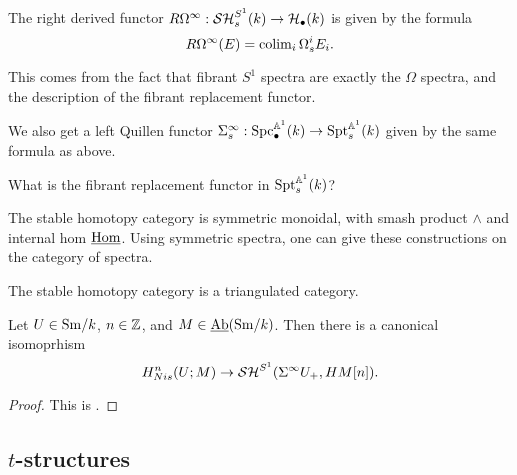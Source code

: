\documentclass{amsart}%
\begin{document}
\begin{remark}
  The right derived functor
  $R\Omega^{\infty} : \mathcal{SH}^{S^1}_s(k) \to \mathcal{H}_{\bullet}(k)$ is given by
  the formula
  \begin{equation*}
    R\Omega^{\infty}(E) = \operatorname{colim}_i \Omega_s^{i}E_i.
  \end{equation*}

  This comes from the fact that fibrant $S^1$ spectra are exactly the
  $\Omega$ spectra, and the description of the fibrant replacement
  functor. 
\end{remark}

\begin{remark}
  We also get a left Quillen functor
  $ \Sigma^{\infty}_s : \mathrm{Spc}_{\bullet}^{\mathbb{A}^1}(k) \to
  \mathrm{Spt}_s^{\mathbb{A}^1}(k)$ given by the same formula as above.

  What is the fibrant replacement functor in $\mathrm{Spt}_s^{\mathbb{A}^1}(k)$?
\end{remark}

\begin{remark}
  The stable homotopy category is symmetric monoidal, with smash
  product $\wedge$ and internal hom $\underline{\operatorname{Hom}}$. Using
  symmetric spectra, one can give these constructions on the category
  of spectra.

  The stable homotopy category is a triangulated category.  
\end{remark}

\begin{proposition}
  Let $U \in \mathrm{Sm}/k$, $n\in \mathbb{Z}$, and $M \in \operatorname{\underline{Ab}}(\mathrm{Sm}/k)$. Then there
  is a canonical isomoprhism
  \begin{equation*}
    H^n_{Nis}(U; M) \to \mathcal{SH}^{S^1}(\Sigma^{\infty}U_+, HM[n]).
  \end{equation*}
\end{proposition}

\begin{proof}
  This is \cite[Lemma 3.2.3]{Mor05}.
\end{proof}

\subsection{$t$-structures}
\end{document}
